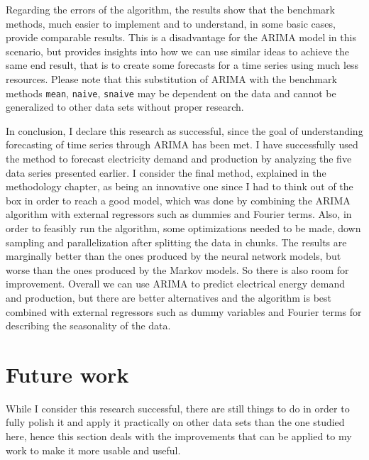 \documentclass[12pt,a4paper,titlepage]{report}
\begin{document}
Regarding the errors of the algorithm, the results show that the benchmark methods, much easier to implement and to understand, in some basic cases, provide comparable results. This is a disadvantage for the ARIMA model in this scenario, but provides insights into how we can use similar ideas to achieve the same end result, that is to create some forecasts for a time series using much less resources. Please note that this substitution of ARIMA with the benchmark methods \texttt{mean}, \texttt{naive}, \texttt{snaive} may be dependent on the data and cannot be generalized to other data sets without proper research.

In conclusion, I declare this research as successful, since the goal of understanding forecasting of time series through ARIMA has been met.
I have successfully used the method to forecast electricity demand and production by analyzing the five data series presented earlier.
I consider the final method, explained in the methodology chapter, as being an innovative one since I had to think out of the box in order to reach a good model, which was done by combining the ARIMA algorithm with external regressors such as dummies and Fourier terms. Also, in order to feasibly run the algorithm, some optimizations needed to be made, down sampling and parallelization after splitting the data in chunks.
The results are marginally better than the ones produced by the neural network models, but worse than the ones produced by the Markov models. So there is also room for improvement.
Overall we can use ARIMA to predict electrical energy demand and production, but there are better alternatives and the algorithm is best combined with external regressors such as dummy variables and Fourier terms for describing the seasonality of the data.

\section{Future work}

While I consider this research successful, there are still things to do in order to fully polish it and apply it practically on other data sets than the one studied here, hence this section deals with the improvements that can be applied to my work to make it more usable and useful.
\end{document}
